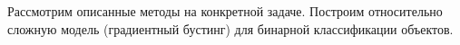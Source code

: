 Рассмотрим описанные методы на конкретной задаче. Построим относительно сложную модель (градиентный бустинг) для бинарной классификации объектов.